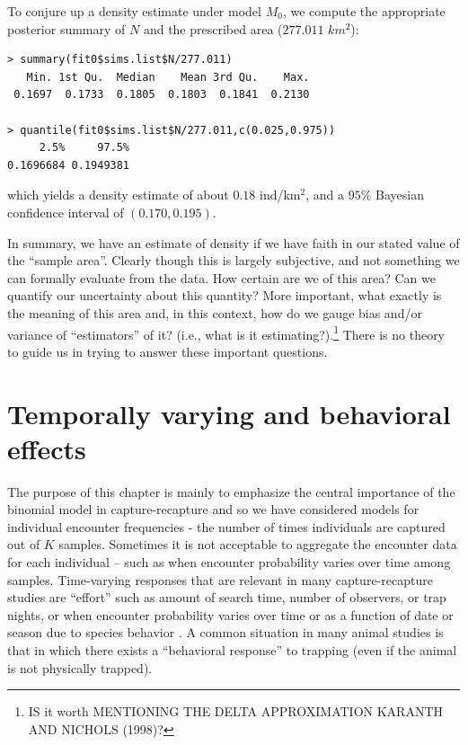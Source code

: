 To conjure up a
density estimate under model $M_0$, we compute the appropriate
posterior summary of $N$ and the prescribed area ($277.011$ $km^2$):
{\small
\begin{verbatim}
> summary(fit0$sims.list$N/277.011)
   Min. 1st Qu.  Median    Mean 3rd Qu.    Max.
 0.1697  0.1733  0.1805  0.1803  0.1841  0.2130

> quantile(fit0$sims.list$N/277.011,c(0.025,0.975))
     2.5%     97.5%
0.1696684 0.1949381
\end{verbatim}
}
which yields a density estimate of about $0.18$ ind/km$^2$, and a $95\%$ Bayesian
confidence interval of $(0.170, 0.195)$.

In summary, we have an estimate of density if we have faith in our
stated value of the ``sample area''. Clearly though this is largely
subjective, and not something we can formally evaluate from the data.
How certain are we of this area? Can
we quantify our uncertainty about this quantity? 
 More important, what exactly is
the meaning of this area and, in this context, how do we gauge bias
and/or variance of ``estimators'' of it? (i.e., what is it
estimating?).\footnote{IS it worth MENTIONING THE DELTA APPROXIMATION KARANTH AND NICHOLS (1998)?}
There is no theory to guide us in trying to answer these important questions.


\section{Temporally varying and behavioral effects}

The purpose of this chapter is mainly to emphasize the central
importance of the binomial model in capture-recapture and so we have
considered models for individual encounter frequencies - the number of
times individuals are captured out of $K$ samples.  Sometimes it is
not acceptable to aggregate the encounter data for each individual --
such as when encounter probability varies over time among samples. 
Time-varying responses that are relevant in many
capture-recapture studies are ``effort'' such as amount of search time,
number of observers, or trap nights, or when encounter probability
varies over time or as a function of date or season due to species behavior
\citep{kery_etal:2010}.
  A common situation in many animal studies is that in
which there exists a ``behavioral response'' to trapping (even if the
animal is not physically trapped). 

